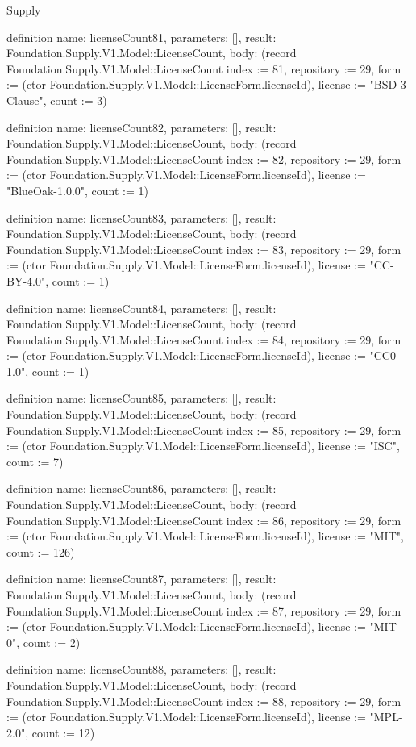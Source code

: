 \begin{lexlean}{Supply}
\begin{semanticmodule}
definition{
  name: licenseCount81,
  parameters: [],
  result: Foundation.Supply.V1.Model::LicenseCount,
  body: (record Foundation.Supply.V1.Model::LicenseCount {index := 81, repository := 29, form := (ctor Foundation.Supply.V1.Model::LicenseForm.licenseId), license := "BSD-3-Clause", count := 3})
}

definition{
  name: licenseCount82,
  parameters: [],
  result: Foundation.Supply.V1.Model::LicenseCount,
  body: (record Foundation.Supply.V1.Model::LicenseCount {index := 82, repository := 29, form := (ctor Foundation.Supply.V1.Model::LicenseForm.licenseId), license := "BlueOak-1.0.0", count := 1})
}

definition{
  name: licenseCount83,
  parameters: [],
  result: Foundation.Supply.V1.Model::LicenseCount,
  body: (record Foundation.Supply.V1.Model::LicenseCount {index := 83, repository := 29, form := (ctor Foundation.Supply.V1.Model::LicenseForm.licenseId), license := "CC-BY-4.0", count := 1})
}

definition{
  name: licenseCount84,
  parameters: [],
  result: Foundation.Supply.V1.Model::LicenseCount,
  body: (record Foundation.Supply.V1.Model::LicenseCount {index := 84, repository := 29, form := (ctor Foundation.Supply.V1.Model::LicenseForm.licenseId), license := "CC0-1.0", count := 1})
}

definition{
  name: licenseCount85,
  parameters: [],
  result: Foundation.Supply.V1.Model::LicenseCount,
  body: (record Foundation.Supply.V1.Model::LicenseCount {index := 85, repository := 29, form := (ctor Foundation.Supply.V1.Model::LicenseForm.licenseId), license := "ISC", count := 7})
}

definition{
  name: licenseCount86,
  parameters: [],
  result: Foundation.Supply.V1.Model::LicenseCount,
  body: (record Foundation.Supply.V1.Model::LicenseCount {index := 86, repository := 29, form := (ctor Foundation.Supply.V1.Model::LicenseForm.licenseId), license := "MIT", count := 126})
}

definition{
  name: licenseCount87,
  parameters: [],
  result: Foundation.Supply.V1.Model::LicenseCount,
  body: (record Foundation.Supply.V1.Model::LicenseCount {index := 87, repository := 29, form := (ctor Foundation.Supply.V1.Model::LicenseForm.licenseId), license := "MIT-0", count := 2})
}

definition{
  name: licenseCount88,
  parameters: [],
  result: Foundation.Supply.V1.Model::LicenseCount,
  body: (record Foundation.Supply.V1.Model::LicenseCount {index := 88, repository := 29, form := (ctor Foundation.Supply.V1.Model::LicenseForm.licenseId), license := "MPL-2.0", count := 12})
}


\end{semanticmodule}
\end{lexlean}
